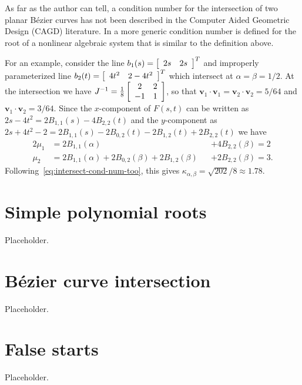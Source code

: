 As far as the author can tell,
a condition number for the intersection of two planar B\'{e}zier curves
has not been described in the Computer Aided Geometric Design (CAGD)
literature. In \cite[Chapter~25, Equation 25.11]{Higham2002}
a more generic condition number is defined for the root of a nonlinear
algebraic system that is similar to the definition above.

For an example, consider the line
\(b_1(s) = \left[ \begin{array}{c c} 2s & 2s \end{array}\right]^T\)
and improperly parameterized line
\(b_2(t) = \left[ \begin{array}{c c} 4t^2 & 2 - 4t^2
\end{array}\right]^T\) which intersect at \(\alpha = \beta = 1/2\).
At the intersection we have \(J^{-1} = \frac{1}{8}
\left[ \begin{array}{c c} 2 & 2 \\ -1 & 1 \end{array}\right]\),
so that \(\bm{v}_1 \cdot \bm{v}_1 = \bm{v}_2 \cdot \bm{v}_2 =
5/64\) and \(\bm{v}_1 \cdot \bm{v}_2 = 3/64\). Since the
\(x\)-component of \(F(s, t)\) can be written as
\(2s - 4t^2 = 2 B_{1, 1}(s) - 4 B_{2, 2}(t)\) and the
\(y\)-component as \(2s + 4t^2 - 2 = 2 B_{1, 1}(s) - 2 B_{0, 2}(t)
- 2 B_{1, 2}(t) + 2 B_{2, 2}(t)\) we have
\begin{alignat}{2}
\mu_1 &= 2 B_{1, 1}(\alpha) &&+ 4 B_{2, 2}(\beta) = 2 \\
\mu_2 &= 2 B_{1, 1}(\alpha) + 2 B_{0, 2}(\beta) +
  2 B_{1, 2}(\beta) &&+ 2 B_{2, 2}(\beta) = 3.
\end{alignat}
Following~\eqref{eq:intersect-cond-num-too}, this gives
\(\kappa_{\alpha, \beta} = \sqrt{202}/8 \approx 1.78\).

\section{Simple polynomial roots}\label{sec:compensated-simple-roots}

Placeholder.

\section{B\'{e}zier curve intersection}\label{sec:compensated-curve-intersect}

Placeholder.

\section{False starts}\label{sec:false-starts}

Placeholder.

